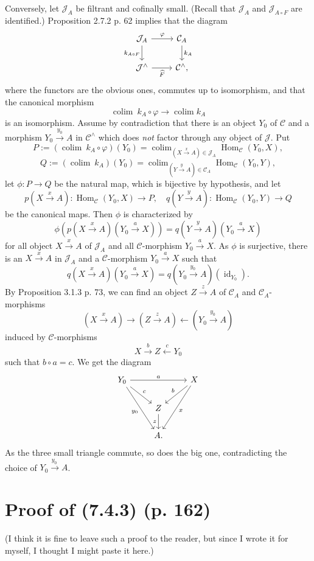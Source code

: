 \documentclass[12pt]{article}
\theoremstyle{remark}
\newcommand{\n}{\noindent}
\newcommand{\C}{\mathcal C}
\newcommand{\J}{\mathcal J}
\newcommand{\p}{\varphi}
\DeclareMathOperator*{\coli}{colim}
\DeclareMathOperator{\id}{id}
\DeclareMathOperator{\Hom}{Hom}
\begin{document}
\n Conversely, let $\J_A$ be filtrant and cofinally small. (Recall that $\J_A$ and $\J_{A\circ F}$ are identified.) Proposition 2.7.2 p. 62 implies that the diagram
$$
\begin{tikzcd}
\J_A\ar{r}{\p}\ar{d}[swap]{k_{A\circ F}}&
\C_A\ar{d}{k_A}
\\
\J^\wedge\ar{r}[swap]{\widehat F}&\C^\wedge,
\end{tikzcd}
$$
where the functors are the obvious ones, commutes up to isomorphism, and that the canonical morphism 
$$
\coli\ k_A\circ\p\to\coli k_A
$$
is an isomorphism. Assume by contradiction that there is an object $Y_0$ of $\C$ and a morphism $Y_0\overset{y_0}{\to}A$ in $\C^\wedge$ which does \emph{not} factor through any object of $\J$. Put 
$$
P:=\left(\coli\ k_A\circ\p\right)(Y_0)=\coli_{(X\overset{x}{\to}A)\in\J_A}\Hom_\C(Y_0,X),
$$
$$
Q:=\left(\coli\ k_A\right)(Y_0)=\coli_{(Y\overset{y}{\to}A)\in\C_A}\Hom_\C(Y_0,Y),
$$
let $\phi:P\to Q$ be the natural map, which is bijective by hypothesis, and let 
$$
p(X\overset{x}{\to}A):\Hom_\C(Y_0,X)\to P,\quad q(Y\overset{y}{\to}A):\Hom_\C(Y_0,Y)\to Q
$$
be the canonical maps. Then $\phi$ is characterized by 
$$
\phi(p(X\overset{x}{\to}A)(Y_0\overset{a}{\to}X))=q(Y\overset{y}{\to}A)(Y_0\overset{a}{\to}X)
$$
for all object $X\overset{x}{\to}A$ of $\J_A$ and all $\C$-morphism $Y_0\overset{a}{\to}X$. As $\phi$ is surjective, there is an $X\overset{x}{\to}A$ in $\J_A$ and a $\C$-morphism $Y_0\overset{a}{\to}X$ such that 
$$
q(X\overset{x}{\to}A)(Y_0\overset{a}{\to}X)=q(Y_0\overset{y_0\ }{\to}A)(\id_{Y_0}).
$$
By Proposition 3.1.3 p. 73, we can find an object $Z\overset{z}{\to}A$ of $\C_A$ and $\C_A$-morphisms 
$$
(X\overset{x}{\to}A)\to(Z\overset{z}{\to}A)\leftarrow(Y_0\overset{y_0\ }{\to}A)
$$
induced by $\C$-morphisms 
$$
X\overset{b}{\to}Z\overset{c}{\leftarrow}Y_0
$$
such that $b\circ a=c$. We get the diagram 
$$
\begin{tikzcd}
Y_0\ar{rr}{a}\ar{dr}{c}\ar{ddr}[swap]{y_0}&&X\ar{dl}[swap]{b}\ar{ddl}{x}\\
&Z\ar{d}[swap]{z}&\\
&A.
\end{tikzcd}
$$
As the three small triangle commute, so does the big one, contradicting the choice of $Y_0\overset{y_0\ }{\to}A$. 
%
\section{Proof of (7.4.3) (p. 162)}%
%
(I think it is fine to leave such a proof to the reader, but since I wrote it for myself, I thought I might paste it here.)
\end{document}
